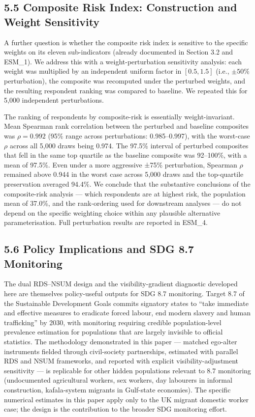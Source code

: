 \documentclass[
  12pt,
  letterpaper,
  DIV=11,
  numbers=noendperiod]{scrartcl}
\begin{document}
\subsection{5.5 Composite Risk Index: Construction and Weight
Sensitivity}\label{composite-risk-index-construction-and-weight-sensitivity}

A further question is whether the composite risk index is sensitive to
the specific weights on its eleven sub-indicators (already documented in
Section 3.2 and ESM\_1). We address this with a weight-perturbation
sensitivity analysis: each weight was multiplied by an independent
uniform factor in \([0.5, 1.5]\) (i.e., \(\pm 50\%\) perturbation), the
composite was recomputed under the perturbed weights, and the resulting
respondent ranking was compared to baseline. We repeated this for 5,000
independent perturbations.

The ranking of respondents by composite-risk is essentially
weight-invariant. Mean Spearman rank correlation between the perturbed
and baseline composites was \(\rho = 0.992\) (95\% range across
perturbations: 0.985--0.997), with the worst-case \(\rho\) across all
5,000 draws being 0.974. The 97.5\% interval of perturbed composites
that fell in the same top quartile as the baseline composite was
92--100\%, with a mean of 97.5\%. Even under a more aggressive ±75\%
perturbation, Spearman \(\rho\) remained above 0.944 in the worst case
across 5,000 draws and the top-quartile preservation averaged 94.4\%. We
conclude that the substantive conclusions of the composite-risk analysis
--- which respondents are at highest risk, the population mean of
37.0\%, and the rank-ordering used for downstream analyses --- do not
depend on the specific weighting choice within any plausible alternative
parameterisation. Full perturbation results are reported in ESM\_4.

\subsection{5.6 Policy Implications and SDG 8.7
Monitoring}\label{policy-implications-and-sdg-8.7-monitoring}

The dual RDS--NSUM design and the visibility-gradient diagnostic
developed here are themselves policy-useful outputs for SDG 8.7
monitoring. Target 8.7 of the Sustainable Development Goals commits
signatory states to ``take immediate and effective measures to eradicate
forced labour, end modern slavery and human trafficking'' by 2030, with
monitoring requiring credible population-level prevalence estimation for
populations that are largely invisible to official statistics. The
methodology demonstrated in this paper --- matched ego-alter instruments
fielded through civil-society partnerships, estimated with parallel RDS
and NSUM frameworks, and reported with explicit visibility-adjustment
sensitivity --- is replicable for other hidden populations relevant to
8.7 monitoring (undocumented agricultural workers, sex workers, day
labourers in informal construction, kafala-system migrants in Gulf-state
economies). The specific numerical estimates in this paper apply only to
the UK migrant domestic worker case; the design is the contribution to
the broader SDG monitoring effort.
\end{document}
